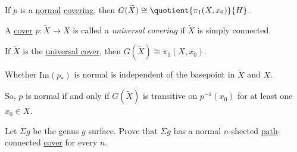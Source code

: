 \begin{corollary}
	If \(p\) is a \hyperref[def:normal]{normal} \hyperref[def:covering-map]{covering}, then \(G(\widetilde{X} ) \cong \quotient{\pi _1(X, x_0)}{H} \).
\end{corollary}

\begin{definition}\label{def:universal-covering}
	A \hyperref[def:covering-map]{cover} \(p\colon \widetilde{X} \to X\) is called a \emph{universal covering} if \(\widetilde{X} \) is simply connected.
\end{definition}
\begin{corollary}
	If \(\widetilde{X} \) is the \hyperref[def:universal-covering]{universal cover}, then \(G(\widetilde{X} )\cong \pi _1(X, x_0)\).
\end{corollary}

\begin{exercise}
	Whether \(\mathrm{Im}(p_\ast)\) is normal is independent of the basepoint in \(\widetilde{X} \) and \(X\).
\end{exercise}

So, \(p\) is normal if and only if \(G(\widetilde{X} )\) is transitive on \(p^{-1} (x_0)\) for at least one
\(x_0\in X\).
\begin{exercise}
	Let \(\Sigma g\) be the genus \(g\) surface. Prove that \(\Sigma g\) has a normal \(n\)-sheeted \hyperref[def:path]{path}-connected
	\hyperref[def:covering-map]{cover} for every \(n\).
\end{exercise}